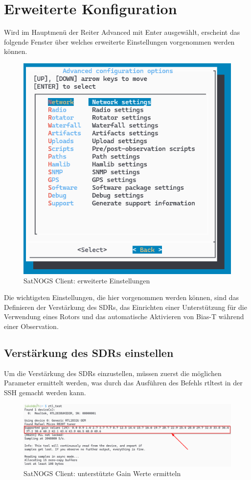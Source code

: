 \section{Erweiterte Konfiguration} 
Wird im Hauptmenü der Reiter \glqq Advanced\grqq{} mit \glqq Enter\grqq{} ausgewählt, erscheint das folgende Fenster über welches erweiterte Einstellungen vorgenommen werden können. 

\begin{figure} [H]
	\centering
	\includegraphics[width=.5\linewidth]{../ref/advanced_settings.png}
	\caption{SatNOGS Client: erweiterte Einstellungen}
	\label{fig:advanced_settings}
\end{figure}

Die wichtigsten Einstellungen, die hier vorgenommen werden können, sind das Definieren der Verstärkung des SDRs, das Einrichten einer Unterstützung für die Verwendung eines Rotors und das automatische Aktivieren von Bias-T während einer Observation.

\subsection{Verstärkung des SDRs einstellen}
Um die Verstärkung des SDRs einzustellen, müssen zuerst die möglichen Parameter ermittelt werden, was durch das Ausführen des Befehls \glqq rtl\textunderscore test\grqq{} in der SSH gemacht werden kann. 

\begin{figure} [H]
	\centering
	\includegraphics[width=\linewidth]{../ref/supportedgain.png}
	\caption{SatNOGS Client: unterstützte Gain Werte ermitteln}
	\label{fig:supportedgain}
\end{figure}

